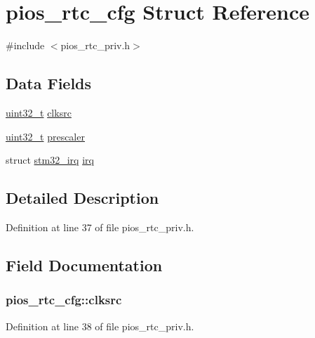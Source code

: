 \hypertarget{structpios__rtc__cfg}{\section{pios\-\_\-rtc\-\_\-cfg Struct Reference}
\label{structpios__rtc__cfg}
}


{\ttfamily \#include $<$pios\-\_\-rtc\-\_\-priv.\-h$>$}

\subsection*{Data Fields}
\begin{DoxyCompactItemize}
\item 
\hyperlink{stdint_8h_a435d1572bf3f880d55459d9805097f62}{uint32\-\_\-t} \hyperlink{structpios__rtc__cfg_a6ed1405edce6d0ed2251dc6936b4eec9}{clksrc}
\item 
\hyperlink{stdint_8h_a435d1572bf3f880d55459d9805097f62}{uint32\-\_\-t} \hyperlink{structpios__rtc__cfg_a9ba0d9532d31cd9ff861f59a2d2d7c98}{prescaler}
\item 
struct \hyperlink{structstm32__irq}{stm32\-\_\-irq} \hyperlink{structpios__rtc__cfg_aa3d36b543b26502f3063228fc2c69496}{irq}
\end{DoxyCompactItemize}


\subsection{Detailed Description}


Definition at line 37 of file pios\-\_\-rtc\-\_\-priv.\-h.



\subsection{Field Documentation}
\hypertarget{structpios__rtc__cfg_a6ed1405edce6d0ed2251dc6936b4eec9}{
\subsubsection[{clksrc}]{ pios\-\_\-rtc\-\_\-cfg\-::clksrc}}\label{structpios__rtc__cfg_a6ed1405edce6d0ed2251dc6936b4eec9}


Definition at line 38 of file pios\-\_\-rtc\-\_\-priv.\-h.

